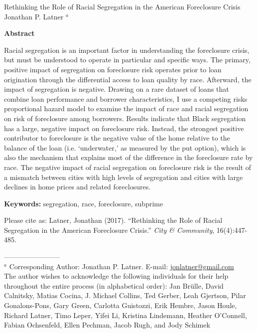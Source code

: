 \documentclass[12pt]{article}
\begin{document}
\clearpage

\thispagestyle{empty}

\begin{center}
\large Rethinking the Role of Racial Segregation in the American Foreclosure Crisis \\
\bigskip
\normalsize
Jonathan P. Latner $^{a}$\\
\end{center}

{\bf  Abstract}

Racial segregation is an important factor in understanding the foreclosure crisis, but must be understood to operate in particular and specific ways. The primary, positive impact of segregation on foreclosure risk operates prior to loan origination through the differential access to loan quality by race. Afterward, the impact of segregation is negative. Drawing on a rare dataset of loans that combine loan performance and borrower characteristics, I use a competing risks proportional hazard model to examine the impact of race and racial segregation on risk of foreclosure among borrowers.  Results indicate that Black segregation has a large, negative impact on foreclosure risk.  Instead, the strongest positive contributor to foreclosure is the negative value of the home relative to the balance of the loan (i.e. `underwater,' as measured by the put option), which is also the mechanism that explains most of the difference in the foreclosure rate by race.  The negative impact of racial segregation on foreclosure risk is the result of a mismatch between cities with high levels of segregation and cities with large declines in home prices and related foreclosures.


{\bf  Keywords:} segregation, race, foreclosure, subprime

Please cite as: Latner, Jonathan (2017).  ``Rethinking the Role of Racial Segregation in the American Foreclosure Crisis.'' \emph{City \& Community}, 16(4):447-485.

\vfill

------------------------ \\
\footnotesize
$^{a}$ Corresponding Author: Jonathan P. Latner.  E-mail:  \url{jonlatner@gmail.com}\\
The author wishes to acknowledge the following individuals for their help throughout the entire process (in alphabetical order): Jan Brülle, David Calnitsky, Matias Cocina, J. Michael Collins, Ted Gerber, Leah Gjertson, Pilar Gonalons-Pons, Gary Green, Carlotta Guistozzi, Erik Hembre, Jason Houle, Richard Latner, Timo Leper, Yifei Li, Kristina Lindemann, Heather O’Connell, Fabian Ochsenfeld, Ellen Pechman, Jacob Rugh, and Jody Schimek
\end{document}
